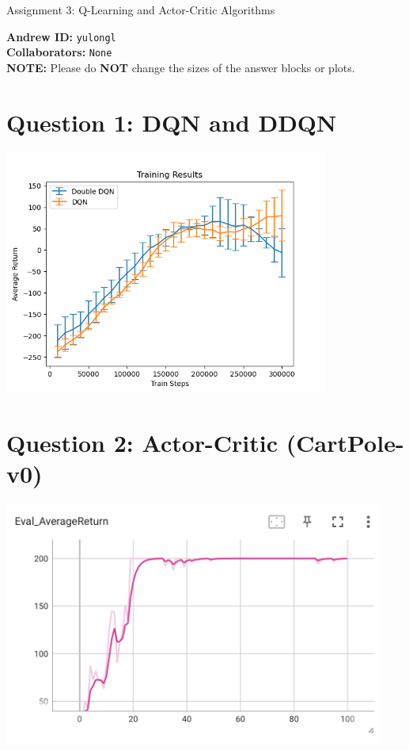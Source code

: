 \documentclass{article}
\begin{document}

\begin{centering}
    {\Large Assignment 3: Q-Learning and Actor-Critic Algorithms
} \\
    \vspace{.25cm}
\end{centering}
\vspace{0.25cm}

\textbf{Andrew ID:} \texttt{yulongl} \\
\textbf{Collaborators:} \texttt{None} \\ 
\textbf{NOTE:} Please do \textbf{NOT} change the sizes of the answer blocks or plots.

\setcounter{section}{0}
\section{Question 1: DQN and DDQN}
\begin{answer}[title=Question 1,height=9.5cm,width=\linewidth]
\centering
\includegraphics[height=8cm]{q1.png}
\end{answer}

\section{Question 2: Actor-Critic (CartPole-v0)}
\begin{answer}[title=Question 2,height=9.5cm,width=\linewidth]
\centering
\includegraphics[height=8cm]{q2.png}
\end{answer}
\end{document}
